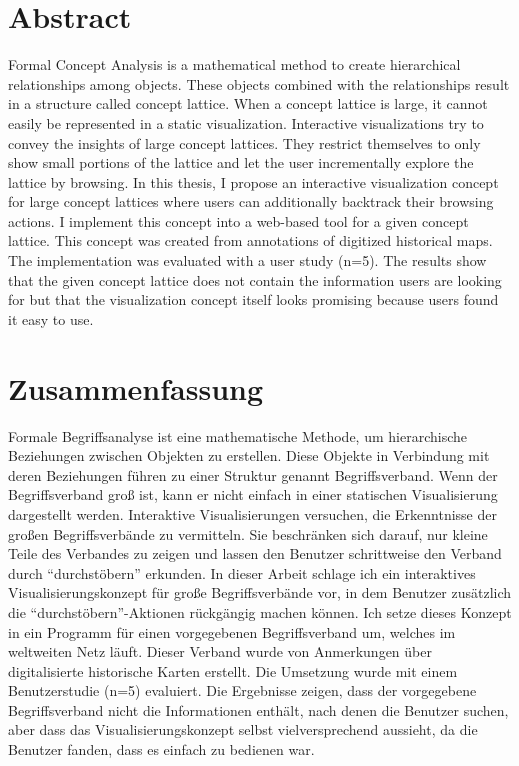 \documentclass[11pt]{report}
\begin{document}


\renewcommand{\thepage}{\roman{page}}%

\newpage
\thispagestyle{empty}
\mbox{}

\chapter*{Abstract}
Formal Concept Analysis is a mathematical method to create hierarchical relationships among objects. These objects combined with the relationships result in a structure called concept lattice. When a concept lattice is large, it cannot easily be represented in a static visualization. Interactive visualizations try to convey the insights of large concept lattices. They restrict themselves to only show small portions of the lattice and let the user incrementally explore the lattice by browsing. In this thesis, I propose an interactive visualization concept for large concept lattices where users can additionally backtrack their browsing actions. I implement this concept into a web-based tool for a given concept lattice. This concept was created from annotations of digitized historical maps. The implementation was evaluated with a user study (n=5). The results show that the given concept lattice does not contain the information users are looking for but that the visualization concept itself looks promising because users found it easy to use.

\newpage
\thispagestyle{empty}
\mbox{}

\chapter*{Zusammenfassung}

Formale Begriffsanalyse ist eine mathematische Methode, um hierarchische Beziehungen zwischen Objekten zu erstellen. Diese Objekte in Verbindung mit deren Beziehungen führen zu einer Struktur genannt Begriffsverband. Wenn der Begriffsverband groß ist, kann er nicht einfach in einer statischen Visualisierung dargestellt werden. Interaktive Visualisierungen versuchen, die Erkenntnisse der großen Begriffsverbände zu vermitteln. Sie beschränken sich darauf, nur kleine Teile des Verbandes zu zeigen und lassen den Benutzer schrittweise den Verband durch ``durchstöbern'' erkunden. In dieser Arbeit schlage ich ein interaktives Visualisierungskonzept für große Begriffsverbände vor, in dem Benutzer zusätzlich die ``durchstöbern''-Aktionen rückgängig machen können. Ich setze dieses Konzept in ein Programm für einen vorgegebenen Begriffsverband um, welches im weltweiten Netz läuft. Dieser Verband wurde von Anmerkungen über digitalisierte historische Karten erstellt. Die Umsetzung wurde mit einem Benutzerstudie (n=5) evaluiert. Die Ergebnisse zeigen, dass der vorgegebene Begriffsverband nicht die Informationen enthält, nach denen die Benutzer suchen, aber dass das Visualisierungskonzept selbst vielversprechend aussieht, da die Benutzer fanden, dass es einfach zu bedienen war.
\end{document}
